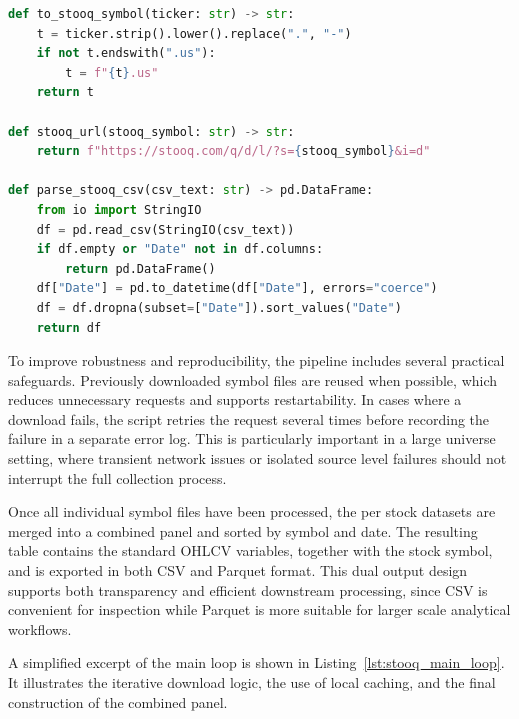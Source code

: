 \begin{lstlisting}[language=Python, caption={Downloading daily OHLCV data from Stooq}, label={lst:stooq_daily_prices}]
def to_stooq_symbol(ticker: str) -> str:
    t = ticker.strip().lower().replace(".", "-")
    if not t.endswith(".us"):
        t = f"{t}.us"
    return t

def stooq_url(stooq_symbol: str) -> str:
    return f"https://stooq.com/q/d/l/?s={stooq_symbol}&i=d"

def parse_stooq_csv(csv_text: str) -> pd.DataFrame:
    from io import StringIO
    df = pd.read_csv(StringIO(csv_text))
    if df.empty or "Date" not in df.columns:
        return pd.DataFrame()
    df["Date"] = pd.to_datetime(df["Date"], errors="coerce")
    df = df.dropna(subset=["Date"]).sort_values("Date")
    return df
\end{lstlisting}

To improve robustness and reproducibility, the pipeline includes several practical safeguards. Previously downloaded symbol files are reused when possible, which reduces unnecessary requests and supports restartability. In cases where a download fails, the script retries the request several times before recording the failure in a separate error log. This is particularly important in a large universe setting, where transient network issues or isolated source level failures should not interrupt the full collection process.

Once all individual symbol files have been processed, the per stock datasets are merged into a combined panel and sorted by symbol and date. The resulting table contains the standard OHLCV variables, together with the stock symbol, and is exported in both CSV and Parquet format. This dual output design supports both transparency and efficient downstream processing, since CSV is convenient for inspection while Parquet is more suitable for larger scale analytical workflows.

A simplified excerpt of the main loop is shown in Listing~\ref{lst:stooq_main_loop}. It illustrates the iterative download logic, the use of local caching, and the final construction of the combined panel.

